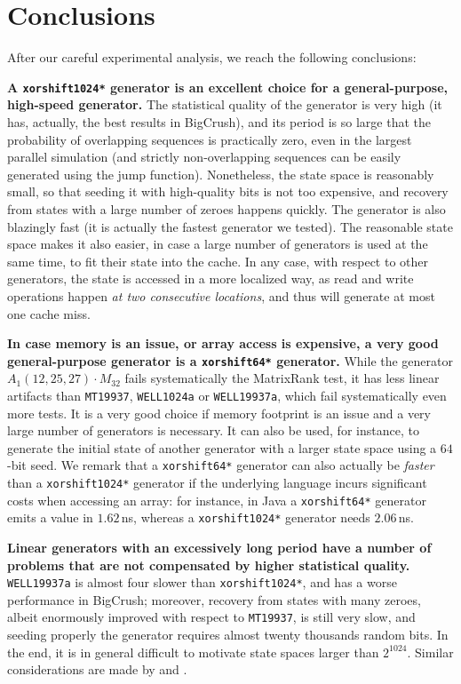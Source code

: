 \documentclass{acmsmalltr}
\newcommand{\xorshifts}[1][]{\texttt{xorshift#1*}\xspace}
\newcommand{\wella}{\texttt{WELL1024a}\xspace}
\newcommand{\wellb}{\texttt{WELL19937a}\xspace}
\newcommand{\mt}[1][]{\texttt{MT19937}\xspace}
\begin{document}
\section{Conclusions}

After our careful experimental analysis, we reach the following conclusions:

\smallskip\noindent\textbf{A \xorshifts[1024] generator is an excellent choice for a
general-purpose, high-speed generator.} The statistical quality of the generator
is very high (it has, actually, the best results in BigCrush), and its period is
so large that the probability of overlapping sequences is practically zero, even
in the largest parallel simulation (and strictly non-overlapping sequences can be easily generated
using the jump function).
Nonetheless, the state space is reasonably small, so that seeding it with
high-quality bits is not too expensive, and recovery from states with a large
number of zeroes happens quickly. The generator is also blazingly fast (it
is actually the fastest generator we tested).
The reasonable state space makes it also easier, in case a large number
of generators is used at the same time, to fit their state into the
cache.
In any case, with respect to other generators, the state is accessed in a more
localized way, as read and write operations happen \emph{at two consecutive locations}, and thus will generate 
at most one cache miss.

\smallskip\noindent\textbf{In case memory is an issue, or array access is
expensive, a very good general-purpose generator is a \xorshifts[64] generator.}
While the generator $A_1(12,25,27)\cdot M_{32}$ fails systematically the
MatrixRank test, it has less linear artifacts than \mt, \wella or \wellb, which
fail systematically even more tests. It is a very good choice if memory footprint is an
issue and a very large number of generators is necessary. It can also be used, for instance, to
generate the initial state of another generator with a larger state space using a $64$-bit seed.
We remark that a \xorshifts[64] generator can also actually be \emph{faster} than a
\xorshifts[1024] generator if the underlying language incurs significant
costs when accessing an array: for instance, in Java a \xorshifts[64] generator
emits a value in $1.62$\,ns, whereas a \xorshifts[1024] generator needs
$2.06$\,ns.

\smallskip\noindent\textbf{Linear generators with an excessively long period have a
number of problems that are not compensated by higher statistical quality.}
\wellb is almost four slower than
\xorshifts[1024], and has a worse performance in BigCrush; moreover, recovery from states
with many zeroes, albeit enormously improved with respect to \mt, is still very slow, and seeding properly
the generator requires almost twenty thousands random bits. In the end,
it is in general difficult to motivate state spaces larger than $2^{1024}$.
Similar considerations are made by  and .
\end{document}
